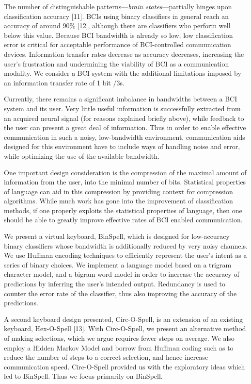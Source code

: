 \documentclass[12pt,titlepage]{article}
\begin{document}
The number of distinguishable patterns---\emph{brain states}---partially hinges upon classification 
accuracy [11].  BCIs using binary classifiers in general reach an accuracy of around 90\% [12], 
although there are classifiers who perform well below this value.  Because BCI bandwidth is 
already so low, low classification error is critical for acceptable performance of BCI-controlled 
communication devices.  Information transfer rates decrease as accuracy decreases, increasing 
the user's frustration and  undermining the viability of BCI as a communication modality. We 
consider a BCI system with the additional limitations imposed by an information transfer rate 
of 1 bit /3s.

Currently, there remains a significant imbalance in bandwidths between a BCI system and its 
user. Very little useful information is successfully extracted from an acquired neural signal (for 
reasons explained briefly above), while feedback to the user can present a great deal of 
information.  Thus in order to enable effective communication in such a noisy, low-bandwidth 
environment, communication aids designed for this environment have to include ways of 
handling noise and error, while optimizing the use of the available bandwidth.

One important design consideration is the compression of the maximal amount of information 
from the user, into the minimal number of bits.  Statistical properties of language can aid in this 
compression by providing context for compression algorithms.  While much work has gone 
into the improvement of classification methods, if one properly exploits the statistical 
properties of language, then one should be able to greatly improve effective rates of BCI 
enabled communication. 

We present a virtual keyboard, BinSpell, which is designed for low-accuracy binary classifiers 
whose bandwidth is additionally reduced by very noisy channels.  We use Huffman encoding 
techniques to efficiently represent the user's intent as a series of binary choices.  We implement 
a language model based on a trigram character model, and a bigram word model in order to 
increase the accuracy of predictions by inferring the user's intended output. Redundancy is used
to counter the error rate of the classifier, thus also improving the accuracy of the predictions.

A second keyboard design presented, Circ-O-Spell, is an extension of an existing keyboard, 
Hex-O-Spell [13].  With Circ-O-Spell, we present an alternative method of making selections, 
which we argue requires fewer steps on average.  We also employ a Hidden Markov Model and 
borrow from Huffman coding such as to reduce the number of steps to a correct selection, and 
hence increase communication speed.  Circ-O-Spell provided us with the exploratory ideas 
which led to BinSpell.  Thus we focus primarily on BinSpell.
\end{document}
